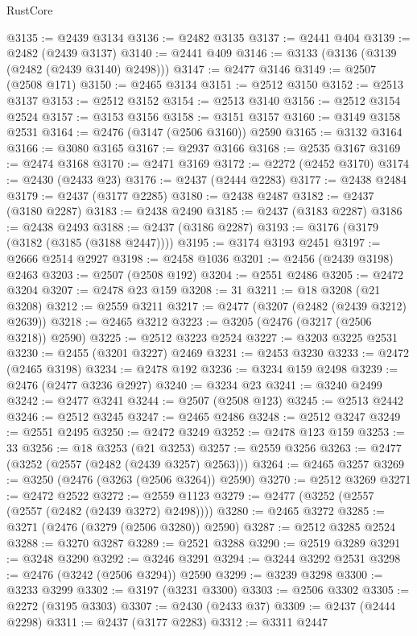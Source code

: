 \begin{lexlean}{RustCore}
\begin{coremodule}
@3135 := @2439 @3134
@3136 := @2482 @3135
@3137 := @2441 @404
@3139 := @2482 (@2439 @3137)
@3140 := @2441 @409
@3146 := @3133 (@3136 (@3139 (@2482 (@2439 @3140) @2498)))
@3147 := @2477 @3146
@3149 := @2507 (@2508 @171)
@3150 := @2465 @3134
@3151 := @2512 @3150
@3152 := @2513 @3137
@3153 := @2512 @3152
@3154 := @2513 @3140
@3156 := @2512 @3154 @2524
@3157 := @3153 @3156
@3158 := @3151 @3157
@3160 := @3149 @3158 @2531
@3164 := @2476 (@3147 (@2506 @3160)) @2590
@3165 := @3132 @3164
@3166 := @3080 @3165
@3167 := @2937 @3166
@3168 := @2535 @3167
@3169 := @2474 @3168
@3170 := @2471 @3169
@3172 := @2272 (@2452 @3170)
@3174 := @2430 (@2433 @23)
@3176 := @2437 (@2444 @2283)
@3177 := @2438 @2484
@3179 := @2437 (@3177 @2285)
@3180 := @2438 @2487
@3182 := @2437 (@3180 @2287)
@3183 := @2438 @2490
@3185 := @2437 (@3183 @2287)
@3186 := @2438 @2493
@3188 := @2437 (@3186 @2287)
@3193 := @3176 (@3179 (@3182 (@3185 (@3188 @2447))))
@3195 := @3174 @3193 @2451
@3197 := @2666 @2514 @2927
@3198 := @2458 @1036
@3201 := @2456 (@2439 @3198) @2463
@3203 := @2507 (@2508 @192)
@3204 := @2551 @2486
@3205 := @2472 @3204
@3207 := @2478 @23 @159
@3208 := 31
@3211 := @18 @3208 (@21 @3208)
@3212 := @2559 @3211
@3217 := @2477 (@3207 (@2482 (@2439 @3212) @2639))
@3218 := @2465 @3212
@3223 := @3205 (@2476 (@3217 (@2506 @3218)) @2590)
@3225 := @2512 @3223 @2524
@3227 := @3203 @3225 @2531
@3230 := @2455 (@3201 @3227) @2469
@3231 := @2453 @3230
@3233 := @2472 (@2465 @3198)
@3234 := @2478 @192
@3236 := @3234 @159 @2498
@3239 := @2476 (@2477 @3236 @2927)
@3240 := @3234 @23
@3241 := @3240 @2499
@3242 := @2477 @3241
@3244 := @2507 (@2508 @123)
@3245 := @2513 @2442
@3246 := @2512 @3245
@3247 := @2465 @2486
@3248 := @2512 @3247
@3249 := @2551 @2495
@3250 := @2472 @3249
@3252 := @2478 @123 @159
@3253 := 33
@3256 := @18 @3253 (@21 @3253)
@3257 := @2559 @3256
@3263 := @2477 (@3252 (@2557 (@2482 (@2439 @3257) @2563)))
@3264 := @2465 @3257
@3269 := @3250 (@2476 (@3263 (@2506 @3264)) @2590)
@3270 := @2512 @3269
@3271 := @2472 @2522
@3272 := @2559 @1123
@3279 := @2477 (@3252 (@2557 (@2557 (@2482 (@2439 @3272) @2498))))
@3280 := @2465 @3272
@3285 := @3271 (@2476 (@3279 (@2506 @3280)) @2590)
@3287 := @2512 @3285 @2524
@3288 := @3270 @3287
@3289 := @2521 @3288
@3290 := @2519 @3289
@3291 := @3248 @3290
@3292 := @3246 @3291
@3294 := @3244 @3292 @2531
@3298 := @2476 (@3242 (@2506 @3294)) @2590
@3299 := @3239 @3298
@3300 := @3233 @3299
@3302 := @3197 (@3231 @3300)
@3303 := @2506 @3302
@3305 := @2272 (@3195 @3303)
@3307 := @2430 (@2433 @37)
@3309 := @2437 (@2444 @2298)
@3311 := @2437 (@3177 @2283)
@3312 := @3311 @2447

\end{coremodule}
\end{lexlean}
